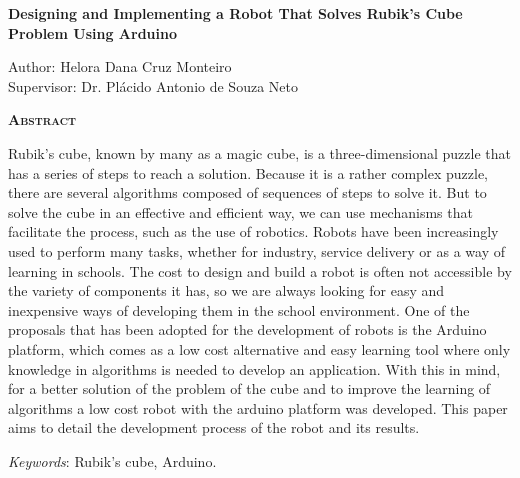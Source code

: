 \begin{center}
	{\Large{\textbf{Designing and Implementing a Robot That Solves Rubik's Cube Problem Using Arduino}}}
\end{center}

\vspace{1cm}

\begin{flushright}
	Author: Helora Dana Cruz Monteiro\\
	Supervisor: Dr. Plácido Antonio de Souza Neto
\end{flushright}

\vspace{1cm}

\begin{center}
	\Large{\textsc{\textbf{Abstract}}}
\end{center}

\noindent Rubik's cube, known by many as a magic cube, is a three-dimensional puzzle that has a series of steps to reach a solution. Because it is a rather complex puzzle, there are several algorithms composed of sequences of steps to solve it. But to solve the cube in an effective and efficient way, we can use mechanisms that facilitate the process, such as the use of robotics. Robots have been increasingly used to perform many tasks, whether for industry, service delivery or as a way of learning in schools. The cost to design and build a robot is often not accessible by the variety of components it has, so we are always looking for easy and inexpensive ways of developing them in the school environment. One of the proposals that has been adopted for the development of robots is the Arduino platform, which comes as a low cost alternative and easy learning tool where only knowledge in algorithms is needed to develop an application. With this in mind, for a better solution of the problem of the cube and to improve the learning of algorithms a low cost robot with the arduino platform was developed. This paper aims to detail the development process of the robot and its results.

\noindent\textit{Keywords}: Rubik's cube, Arduino.